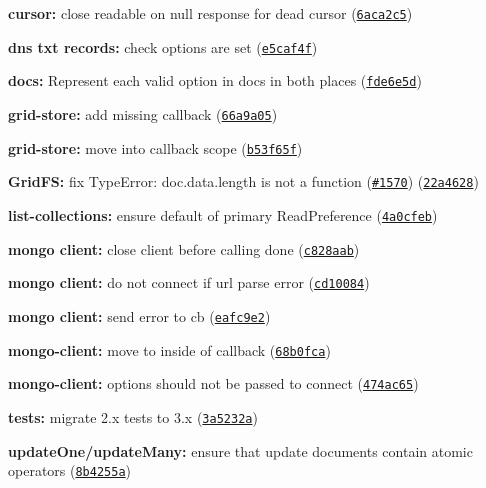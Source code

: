 \begin{DoxyItemize}
\item {\bfseries cursor\+:} close readable on {\ttfamily null} response for dead cursor (\href{https://github.com/mongodb/node-mongodb-native/commit/6aca2c5}{\tt 6aca2c5})
\item {\bfseries dns txt records\+:} check options are set (\href{https://github.com/mongodb/node-mongodb-native/commit/e5caf4f}{\tt e5caf4f})
\item {\bfseries docs\+:} Represent each valid option in docs in both places (\href{https://github.com/mongodb/node-mongodb-native/commit/fde6e5d}{\tt fde6e5d})
\item {\bfseries grid-\/store\+:} add missing callback (\href{https://github.com/mongodb/node-mongodb-native/commit/66a9a05}{\tt 66a9a05})
\item {\bfseries grid-\/store\+:} move into callback scope (\href{https://github.com/mongodb/node-mongodb-native/commit/b53f65f}{\tt b53f65f})
\item {\bfseries Grid\+FS\+:} fix Type\+Error\+: doc.\+data.\+length is not a function (\href{https://github.com/mongodb/node-mongodb-native/issues/1570}{\tt \#1570}) (\href{https://github.com/mongodb/node-mongodb-native/commit/22a4628}{\tt 22a4628})
\item {\bfseries list-\/collections\+:} ensure default of primary Read\+Preference (\href{https://github.com/mongodb/node-mongodb-native/commit/4a0cfeb}{\tt 4a0cfeb})
\item {\bfseries mongo client\+:} close client before calling done (\href{https://github.com/mongodb/node-mongodb-native/commit/c828aab}{\tt c828aab})
\item {\bfseries mongo client\+:} do not connect if url parse error (\href{https://github.com/mongodb/node-mongodb-native/commit/cd10084}{\tt cd10084})
\item {\bfseries mongo client\+:} send error to cb (\href{https://github.com/mongodb/node-mongodb-native/commit/eafc9e2}{\tt eafc9e2})
\item {\bfseries mongo-\/client\+:} move to inside of callback (\href{https://github.com/mongodb/node-mongodb-native/commit/68b0fca}{\tt 68b0fca})
\item {\bfseries mongo-\/client\+:} options should not be passed to {\ttfamily connect} (\href{https://github.com/mongodb/node-mongodb-native/commit/474ac65}{\tt 474ac65})
\item {\bfseries tests\+:} migrate 2.\+x tests to 3.\+x (\href{https://github.com/mongodb/node-mongodb-native/commit/3a5232a}{\tt 3a5232a})
\item {\bfseries update\+One/update\+Many\+:} ensure that update documents contain atomic operators (\href{https://github.com/mongodb/node-mongodb-native/commit/8b4255a}{\tt 8b4255a})

\end{DoxyItemize}
